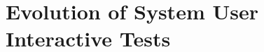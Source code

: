 \chapter{Evolution of System User Interactive Tests}
\label{chap:evolution-system-user-interactive-test}






